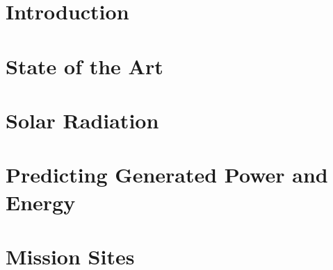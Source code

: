 \documentclass[%
    draft, %
    11pt,
    a4paper
]
{memoir}
\begin{document}

\chapter{Introduction}
\label{sec:Introduction}


\chapter{State of the Art}
\label{sec:StateOfTheArt}



\chapter{Solar Radiation}
\label{sec:MartianEnvironment}


\chapter{Predicting Generated Power and Energy}
\label{sec:PowerAndEnergyPredictions}


\chapter{Mission Sites}
\label{sec:MissionSites}

\end{document}
